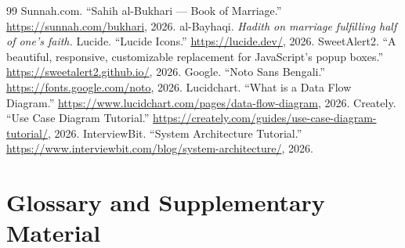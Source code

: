\documentclass[12pt,a4paper]{report}
\begin{document}
\begin{thebibliography}{99}
    Sunnah.com. ``Sahih al-Bukhari --- Book of Marriage.'' \url{https://sunnah.com/bukhari}, 2026.
    al-Bayhaqi. \emph{Hadith on marriage fulfilling half of one's faith.}
     Lucide. ``Lucide Icons.'' \url{https://lucide.dev/}, 2026.
 SweetAlert2. ``A beautiful, responsive, customizable replacement for JavaScript's popup boxes.'' \url{https://sweetalert2.github.io/}, 2026.
       Google. ``Noto Sans Bengali.'' \url{https://fonts.google.com/noto}, 2026.
        Lucidchart. ``What is a Data Flow Diagram.'' \url{https://www.lucidchart.com/pages/data-flow-diagram}, 2026.
    Creately. ``Use Case Diagram Tutorial.'' \url{https://creately.com/guides/use-case-diagram-tutorial/}, 2026.
       InterviewBit. ``System Architecture Tutorial.'' \url{https://www.interviewbit.com/blog/system-architecture/}, 2026.

\end{thebibliography}

\appendix

\chapter{Glossary and Supplementary Material}
\label{app:glossary}
\end{document}
